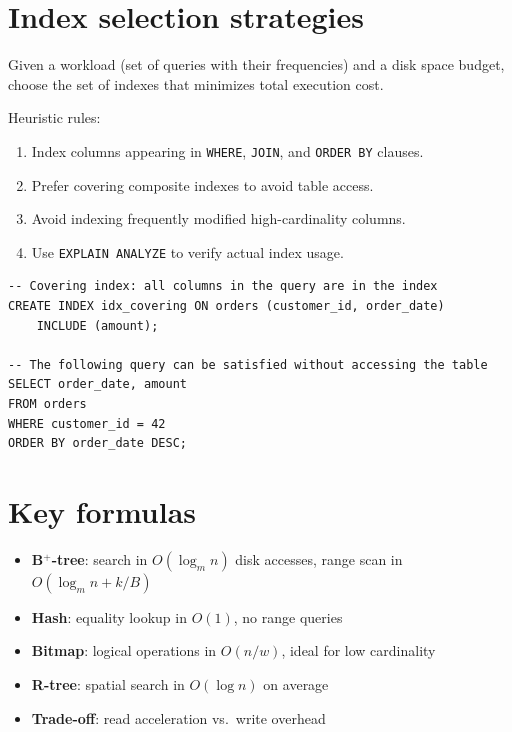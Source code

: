 \section{Index selection strategies}

\begin{definition}
Given a workload (set of queries with their frequencies) and a disk space
budget, choose the set of indexes that minimizes total execution cost.
\end{definition}

Heuristic rules:
\begin{enumerate}
  \item Index columns appearing in \texttt{WHERE}, \texttt{JOIN}, and
        \texttt{ORDER BY} clauses.
  \item Prefer covering composite indexes to avoid table access.
  \item Avoid indexing frequently modified high-cardinality columns.
  \item Use \texttt{EXPLAIN ANALYZE} to verify actual index usage.
\end{enumerate}

\begin{example}
\begin{verbatim}
-- Covering index: all columns in the query are in the index
CREATE INDEX idx_covering ON orders (customer_id, order_date)
    INCLUDE (amount);

-- The following query can be satisfied without accessing the table
SELECT order_date, amount
FROM orders
WHERE customer_id = 42
ORDER BY order_date DESC;
\end{verbatim}
\end{example}

\section{Key formulas}

\begin{keyformulas}
\begin{itemize}
  \item \textbf{B$^+$-tree}: search in $O(\log_m n)$ disk accesses, range scan in $O(\log_m n + k/B)$
  \item \textbf{Hash}: equality lookup in $O(1)$, no range queries
  \item \textbf{Bitmap}: logical operations in $O(n/w)$, ideal for low cardinality
  \item \textbf{R-tree}: spatial search in $O(\log n)$ on average
  \item \textbf{Trade-off}: read acceleration vs.\ write overhead
\end{itemize}
\end{keyformulas}

